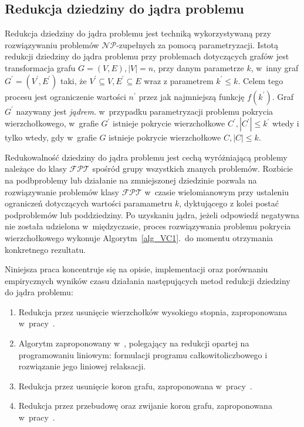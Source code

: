 \subsection{Redukcja dziedziny do jądra problemu}\label{subsection_kernelization}
\par{
  Redukcja dziedziny do jądra problemu jest techniką wykorzystywaną przy
  rozwiązywaniu problemów $\mathcal{NP}$-zupełnych za pomocą parametryzacji.
  Istotą redukcji dziedziny do jądra problemu przy problemach dotyczących grafów
  jest transformacja grafu $G=(V,E), |V|=n$, przy danym parametrze $k$, w~inny
  graf $G^{\prime}=(V^{\prime}, E^{\prime})$ taki, że $V^{\prime} \subseteq V, E^{\prime} \subseteq E$
  wraz z parametrem $k^{\prime} \leq k$.
  Celem tego procesu jest ograniczenie wartości $n^{\prime}$ przez jak najmniejszą
  funkcję $f(k^{\prime})$.
  Graf $G^{\prime}$ nazywany jest \emph{jądrem}.
  w~przypadku parametryzacji problemu pokrycia wierzchołkowego, w~grafie
  $G^{\prime}$ istnieje pokrycie wierzchołkowe $C^{\prime}, |C^{\prime}|\leq k^{\prime}$ 
  wtedy i tylko wtedy, gdy w~grafie $G$ istnieje pokrycie wierzchołkowe $C,
  |C| \leq k$.
}
\par{
  Redukowalność dziedziny do jądra problemu jest cechą wyróżniającą problemy 
  należące do klasy $\mathcal{FPT}$ spośród grupy wszystkich znanych problemów.
  Rozbicie na podbproblemy lub działanie na zmniejszonej dziedzinie pozwala na
  rozwiązywanie problemów klasy $\mathcal{FPT}$ w~czasie wielomianowym przy
  ustaleniu ograniczeń dotyczących wartości paramametru $k$, dyktującego z kolei
  postać podproblemów lub poddziedziny.
  Po uzyskaniu jądra, jeżeli odpowiedź negatywna nie została udzielona
  w~międzyczasie, proces rozwiązywania problemu pokrycia wierzchołkowego
  wykonuje Algorytm~\ref{alg_VC1}.\ do momentu otrzymania konkretnego
  rezultatu.
}
\par{
  Niniejsza praca koncentruje się na opisie, implementacji oraz porównaniu
  empirycznych wyników czasu działania następujących metod redukcji dziedziny do
  jądra problemu:
  \begin{enumerate}
    \item Redukcja przez usunięcie wierzchołków wysokiego stopnia, zaproponowana
      w~pracy~\cite{KernelizationAlgorithms04}.
    \item Algorytm zaproponowany w~\cite{KernelizationAlgorithms04}, polegający
      na redukcji opartej na programowaniu liniowym: formulacji programu
      całkowitoliczbowego i rozwiązanie jego liniowej relaksacji.
    \item Redukcja przez usunięcie koron grafu, zaproponowana
      w~pracy~\cite{abukhzam03}.
    \item Redukcja przez przebudowę oraz zwijanie koron grafu, zaproponowana
      w~pracy~\cite{ImprovedBounds10}.
  \end{enumerate}
}
